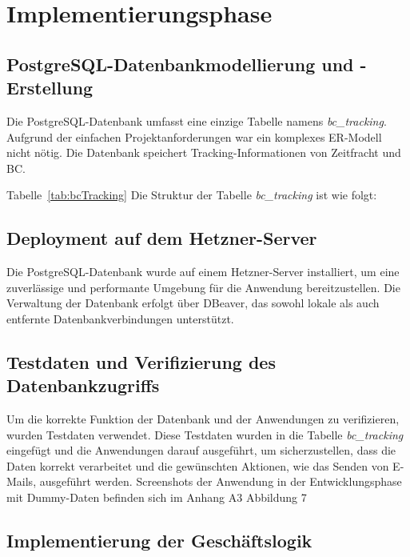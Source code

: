 \section{Implementierungsphase} 
\label{sec:Implementierungsphase}

\subsection{PostgreSQL-Datenbankmodellierung und -Erstellung}
\label{sec:Datenbankmodellierung}

Die PostgreSQL-Datenbank umfasst eine einzige Tabelle namens \textit{bc\_tracking}. 
Aufgrund der einfachen Projektanforderungen war ein komplexes ER-Modell nicht nötig. 
Die Datenbank speichert Tracking-Informationen von Zeitfracht und BC.

Tabelle~\ref{tab:bcTracking} Die Struktur der Tabelle \textit{bc\_tracking} ist wie folgt:
\\


\subsection{Deployment auf dem Hetzner-Server}
\label{sec:Hetzner-Server}

Die PostgreSQL-Datenbank wurde auf einem Hetzner-Server installiert, um eine zuverlässige und performante 
Umgebung für die Anwendung bereitzustellen. Die Verwaltung der Datenbank erfolgt über DBeaver, das sowohl 
lokale als auch entfernte Datenbankverbindungen unterstützt.

\subsection{Testdaten und Verifizierung des Datenbankzugriffs}
\label{sec:VerifizierungTestdaten}

Um die korrekte Funktion der Datenbank und der Anwendungen zu verifizieren, wurden Testdaten verwendet. 
Diese Testdaten wurden in die Tabelle \textit{bc\_tracking} eingefügt und die Anwendungen darauf ausgeführt, 
um sicherzustellen, dass die Daten korrekt verarbeitet und die gewünschten Aktionen, wie das Senden von E-Mails, 
ausgeführt werden. Screenshots der Anwendung in der Entwicklungsphase mit Dummy-Daten befinden sich im Anhang A3 Abbildung 7

\subsection{Implementierung der Geschäftslogik}
\label{sec:Geschaeftslogik}

